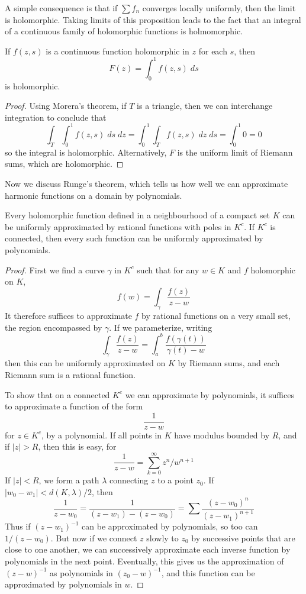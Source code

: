 A simple consequence is that if $\sum f_n$ converges locally uniformly, then the limit is holomorphic. Taking limits of this proposition leads to the fact that an integral of a continuous family of holomorphic functions is holmomorphic.

\begin{theorem}
    If $f(z,s)$ is a continuous function holomorphic in $z$ for each $s$, then
    \[ F(z) = \int_0^1 f(z,s)\; ds \]
    is holomorphic.
\end{theorem}
\begin{proof}
    Using Morera's theorem, if $T$ is a triangle, then we can interchange integration to conclude that
    \[ \int_T \int_0^1 f(z,s)\; ds\; dz = \int_0^1 \int_T f(z,s)\; dz\; ds = \int_0^1 0 = 0 \]
    so the integral is holomorphic. Alternatively, $F$ is the uniform limit of Riemann sums, which are holomorphic.
\end{proof}

Now we discuss Runge's theorem, which tells us how well we can approximate harmonic functions on a domain by polynomials.

\begin{theorem}[Runge]
    Every holomorphic function defined in a neighbourhood of a compact set $K$ can be uniformly approximated by rational functions with poles in $K^c$. If $K^c$ is connected, then every such function can be uniformly approximated by polynomials.
\end{theorem}
\begin{proof}
    First we find a curve $\gamma$ in $K^c$ such that for any $w \in K$ and $f$ holomorphic on $K$,
    \[ f(w) = \int_\gamma \frac{f(z)}{z - w} \]
    It therefore suffices to approximate $f$ by rational functions on a very small set, the region encompassed by $\gamma$. If we parameterize, writing
    \[ \int_\gamma \frac{f(z)}{z - w} = \int_a^b \frac{f(\gamma(t))}{\gamma(t) - w} \]
    then this can be uniformly approximated on $K$ by Riemann sums, and each Riemann sum is a rational function.

    To show that on a connected $K^c$ we can approximate by polynomials, it suffices to approximate a function of the form
    \[ \frac{1}{z - w} \]
    for $z \in K^c$, by a polynomial. If all points in $K$ have modulus bounded by $R$, and if $|z| > R$, then this is easy, for
    \[ \frac{1}{z - w} = \sum_{k = 0}^\infty z^n/w^{n+1} \]
    If $|z| < R$, we form a path $\lambda$ connecting $z$ to a point $z_0$. If $|w_0 - w_1| < d(K,\lambda)/2$, then
    \[ \frac{1}{z - w_0} = \frac{1}{(z - w_1) - (z - w_0)} = \sum \frac{(z - w_0)^n}{(z - w_1)^{n+1}} \]
    Thus if $(z - w_1)^{-1}$ can be approximated by polynomials, so too can $1/(z - w_0)$. But now if we connect $z$ slowly to $z_0$ by successive points that are close to one another, we can successively approximate each inverse function by polynomials in the next point. Eventually, this gives us the approximation of $(z - w)^{-1}$ as polynomials in $(z_0 - w)^{-1}$, and this function can be approximated by polynomials in $w$.
\end{proof}

